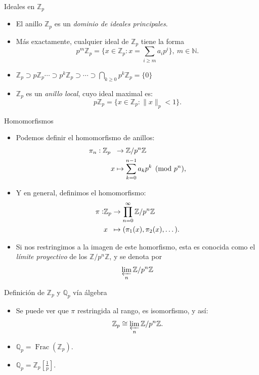 \documentclass{beamer}
\newcommand{\bb}[1]{\mathbb{#1}}
\theoremstyle{definition}
\numberwithin{equation}{section}
\newcommand{\tit}[1]{\textit{#1}}
\renewcommand{\geq}{\geqslant}
\newcommand{\Z}{\mathbb{Z}}
\newcommand{\Qp}{\mathbb{Q}_p}
\newcommand{\Zp}{\mathbb{Z}_p}
\newcommand{\pnorm}[1]{\|#1\|_p}
\begin{document}
\begin{frame}{Ideales en $\Zp$}
	\begin{itemize}[<+- | alert@+>]
		\item El anillo $\Zp$ es un \textit{dominio de ideales principales}.
		\item Más exactamente, cualquier ideal de $\mathbb{Z}_{p}$ tiene la forma
		\[
		p^{m}\mathbb{Z}_{p}=\Big\{x\in\mathbb{Z}_{p}:x=\sum_{i\geq m}a_{i}p^{i}%
		\Big\},\ m\in\mathbb{N}.
		\]
		\item $\mathbb{Z}_{p} \supset p \mathbb{Z}_{p} \cdots \supset p^{k} \mathbb{Z}_{p} \supset \cdots \supset \bigcap_{k \geq 0} p^{k} \mathbb{Z}_{p}=\{0\}$
		\item $\bb{Z}_p$ es un \tit{anillo local}, cuyo ideal maximal es:
		$$p\bb{Z}_p = \{x\in\bb{Z}_p : \pnorm{x}<1\}.$$
	\end{itemize}
\end{frame}

\begin{frame}{Homomorfismos}
	\begin{itemize}[<+- | alert@+>]
		\item Podemos definir el homomorfismo de anillos: \begin{align*}
		\pi_n: \Zp &\hspace{2mm}\rightarrow \Z/p^n\Z \\
		& x \mapsto  \sum_{k=0}^{n-1}a_{k}p^k\pmod{p^n},
		\end{align*}
		\item Y en general, definimos el homomorfismo:	\begin{align*}
		\pi:& \Zp \rightarrow \prod_{n=0}^{\infty}\Z/p^n\Z \\
		& x \hspace{2mm}\mapsto  (\pi_1 (x),\pi_2 (x),\dots) .
		\end{align*}
		\item Si nos restringimos a la imagen de este homorfismo, esta es conocida como el \tit{límite proyectivo} de los  $\Z/p^n\Z$, y se denota por $$\varprojlim_n \Z/p^n\Z$$ 
\end{itemize}
\end{frame}


\begin{frame}{Definición de $\Zp$ y $\Qp$ vía álgebra}
	\begin{itemize}[<+- | alert@+>]
		\item Se puede ver que $\pi$ restringida al rango, es isomorfismo, y así:
		$$\Zp\cong\varprojlim_n \Z/p^n\Z.$$
		\item $\bb{Q}_p=\operatorname{Frac} (\Zp).$
		\item $\bb{Q}_p=\bb{Z}_p[\frac{1}{p}]$.
	\end{itemize}
\end{frame}
\end{document}
